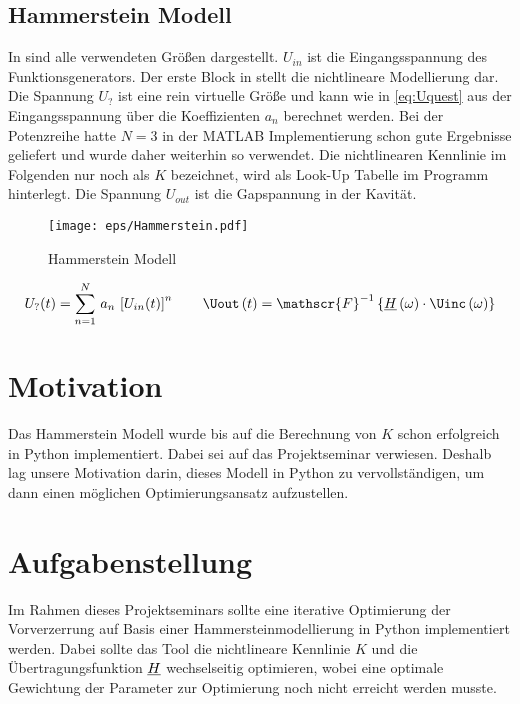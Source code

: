 \documentclass[../Report.tex]{subfiles}
\begin{document}
\subsection{Hammerstein Modell}
\label{subsec:einf.modell_BB.hammerstein}
In  sind alle verwendeten Größen dargestellt. $U_{in}$ ist die Eingangsspannung des Funktionsgenerators. Der erste Block in  stellt die nichtlineare Modellierung dar. Die Spannung $U_{?}$ ist eine rein virtuelle Größe und kann wie in \eqref{eq:Uquest} aus der Eingangsspannung über die Koeffizienten $a_n$ berechnet werden. Bei der Potenzreihe hatte $N = 3$ in der MATLAB Implementierung schon gute Ergebnisse geliefert und wurde daher weiterhin so verwendet. Die nichtlinearen Kennlinie im Folgenden nur noch als $K$ bezeichnet, wird als Look-Up Tabelle im Programm hinterlegt. Die Spannung $U_{out}$ ist die Gapspannung in der Kavität.
\begin{figure}[H]
	\centering
	\texttt{[image: eps/Hammerstein.pdf]}
	\caption{Hammerstein Modell}
  	\label{fig:Hammerstein}
\end{figure}
\begin{align}
	U_?(t)=\sum_{n=1}^N \, a_n \, \left[ U_{in}(t) \right]^n
	\label{eq:Uquest}
	\qquad
	\Uout \oft = \mathscr{F}^{-1} \left\{ \Hcompl \ofomega \cdot \Uinc \ofomega \right\}
\end{align}


\section{Motivation}
\label{sec:einf.motivation}
Das Hammerstein Modell wurde bis auf die Berechnung von $K$ schon erfolgreich in Python implementiert. Dabei sei auf das Projektseminar \cite{PJS_Denys} verwiesen. Deshalb lag unsere Motivation darin, dieses Modell in Python zu vervollständigen, um dann einen möglichen Optimierungsansatz aufzustellen.


\section{Aufgabenstellung}
\label{sec:einf.aufgabe}
Im Rahmen dieses Projektseminars sollte eine iterative Optimierung der Vorverzerrung auf Basis einer Hammersteinmodellierung in Python implementiert werden. Dabei sollte das Tool die nichtlineare Kennlinie $K$ und die Übertragungsfunktion $\underline{H}$ wechselseitig optimieren, wobei eine optimale Gewichtung der Parameter zur Optimierung noch nicht erreicht werden musste.
\end{document}
